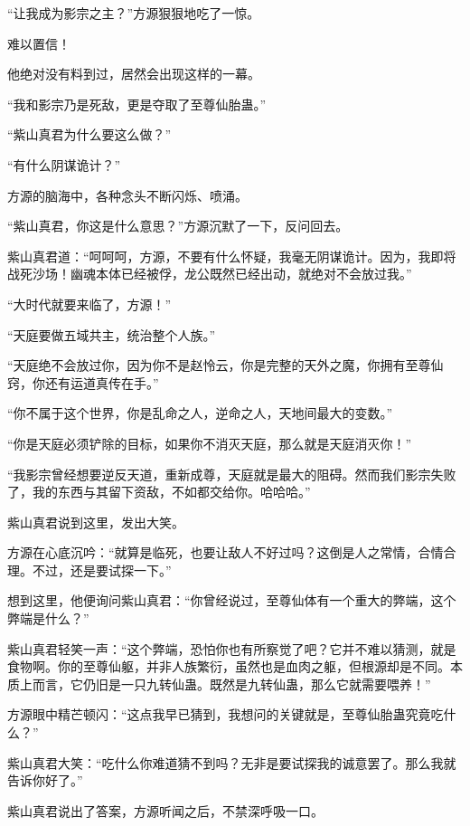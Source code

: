 
\begin{this_body}

“让我成为影宗之主？”方源狠狠地吃了一惊。

难以置信！

他绝对没有料到过，居然会出现这样的一幕。

“我和影宗乃是死敌，更是夺取了至尊仙胎蛊。”

“紫山真君为什么要这么做？”

“有什么阴谋诡计？”

方源的脑海中，各种念头不断闪烁、喷涌。

“紫山真君，你这是什么意思？”方源沉默了一下，反问回去。

紫山真君道：“呵呵呵，方源，不要有什么怀疑，我毫无阴谋诡计。因为，我即将战死沙场！幽魂本体已经被俘，龙公既然已经出动，就绝对不会放过我。”

“大时代就要来临了，方源！”

“天庭要做五域共主，统治整个人族。”

“天庭绝不会放过你，因为你不是赵怜云，你是完整的天外之魔，你拥有至尊仙窍，你还有运道真传在手。”

“你不属于这个世界，你是乱命之人，逆命之人，天地间最大的变数。”

“你是天庭必须铲除的目标，如果你不消灭天庭，那么就是天庭消灭你！”

“我影宗曾经想要逆反天道，重新成尊，天庭就是最大的阻碍。然而我们影宗失败了，我的东西与其留下资敌，不如都交给你。哈哈哈。”

紫山真君说到这里，发出大笑。

方源在心底沉吟：“就算是临死，也要让敌人不好过吗？这倒是人之常情，合情合理。不过，还是要试探一下。”

想到这里，他便询问紫山真君：“你曾经说过，至尊仙体有一个重大的弊端，这个弊端是什么？”

紫山真君轻笑一声：“这个弊端，恐怕你也有所察觉了吧？它并不难以猜测，就是食物啊。你的至尊仙躯，并非人族繁衍，虽然也是血肉之躯，但根源却是不同。本质上而言，它仍旧是一只九转仙蛊。既然是九转仙蛊，那么它就需要喂养！”

方源眼中精芒顿闪：“这点我早已猜到，我想问的关键就是，至尊仙胎蛊究竟吃什么？”

紫山真君大笑：“吃什么你难道猜不到吗？无非是要试探我的诚意罢了。那么我就告诉你好了。”

紫山真君说出了答案，方源听闻之后，不禁深呼吸一口。


\end{this_body}
